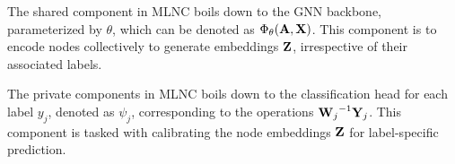\begin{definition} \label{def:shared}
The shared component in MLNC boils down to the GNN backbone, parameterized by $\theta$, which can be denoted as $\Phi_{\theta}(\mathbf{A}, \mathbf{X})$. This component is to encode nodes collectively to generate embeddings $\mathbf{Z}$, irrespective of their associated labels. 
\end{definition}
\begin{definition} \label{def:indHead}
The private components in MLNC boils down to the classification head for each label $y_j$, denoted as $\psi_j$, corresponding to the operations ${\mathbf{W}_j}^{-1}\mathbf{Y}_j$. This component is tasked with calibrating the node embeddings $\mathbf{Z}$ for label-specific prediction.
\end{definition}







